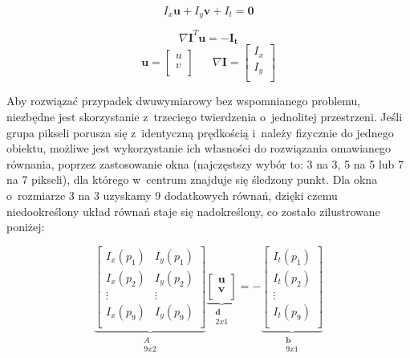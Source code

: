     \[ I_{x}\mathbf{u} + I_{y}\mathbf{v} + I_{t} = \mathbf{0} \]

    \[ \nabla \mathbf{I}^{T} \mathbf{u} = -\mathbf{I_{t}} \]
    \[
      \mathbf{u} =
        \begin{bmatrix}
          u \\
          v \\
        \end{bmatrix}
      \hspace{20pt}
      \nabla \mathbf{I} =
        \begin{bmatrix}
          I_{x} \\
          I_{y} \\
        \end{bmatrix}
    \]

    Aby rozwiązać przypadek dwuwymiarowy bez wspomnianego problemu, niezbędne jest skorzystanie z~trzeciego twierdzenia o~jednolitej przestrzeni. Jeśli grupa pikseli porusza się z~identyczną prędkością i~należy fizycznie do jednego obiektu, możliwe jest wykorzystanie ich własności do rozwiązania omawianego równania, poprzez zastosowanie okna (najczęstszy wybór to: 3 na 3, 5 na 5 lub 7 na 7 pikseli), dla którego w~centrum znajduje się śledzony punkt. Dla okna o~rozmiarze 3 na 3 uzyskamy 9 dodatkowych równań, dzięki czemu niedookreślony układ równań staje się nadokreślony, co zostało zilustrowane poniżej:

    \[
      \underbrace{
        \begin{bmatrix}
          I_{x}(p_{1}) & I_{y}(p_{1}) \\
          I_{x}(p_{2}) & I_{y}(p_{2}) \\
          \vdots       & \vdots       \\
          I_{x}(p_{9}) & I_{y}(p_{9}) \\
        \end{bmatrix}}_{\substack{A\\9x2}}
      \underbrace{
        \begin{bmatrix}
          \mathbf{u} \\
          \mathbf{v} \\
        \end{bmatrix}}_{\substack{\mathbf{d}\\2x1}} =
      -\underbrace{
        \begin{bmatrix}
          I_{t}(p_{1}) \\
          I_{t}(p_{2}) \\
          \vdots       \\
          I_{t}(p_{9}) \\
        \end{bmatrix}}_{\substack{\mathbf{b}\\9x1}}
    \]


